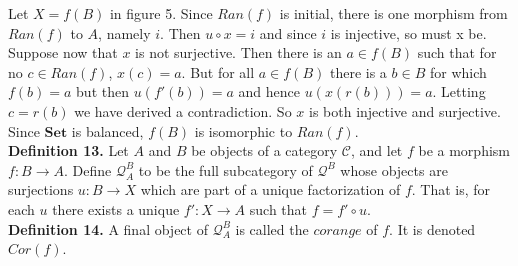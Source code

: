 \documentclass{article}
\theoremstyle{problemstyle}
\begin{document}
Let $X = f(B)$ in figure 5. Since $Ran(f)$ is initial, there is one morphism from $Ran(f)$ to $A$, namely $i$. Then $u\circ x = i$ and since $i$ is injective, so must x be. Suppose now that $x$ is not surjective. Then there is an $a \in f(B)$ such that for no $c \in Ran(f)$, $x(c) = a$. But for all $a \in f(B)$ there is a $b \in B$ for which $f(b) = a$ but then $u(f'(b)) = a$ and hence $u(x(r(b))) = a$. Letting $c = r(b)$ we have derived a contradiction. So $x$ is both injective and surjective. Since $\textbf{Set}$ is balanced, $f(B)$ is isomorphic to $Ran(f)$.\\

\textbf{Definition 13.} Let $A$ and $B$ be objects of a category $\mathcal{C}$, and let $f$ be a morphism $f:B \rightarrow A$. Define $\mathcal{Q}^B_A$ to be the full subcategory of $\mathcal{Q}^B$
whose objects are surjections $u:B\rightarrow X$ which are part of a unique factorization of $f$. That is, for each $u$ there exists a unique $f':X \rightarrow A$ such that $f =f'\circ u$.\\ 

\textbf{Definition 14.} A final object of $\mathcal{Q}^B_A$ is called the $corange$ of $f$. It is denoted $Cor(f)$.
\end{document}
